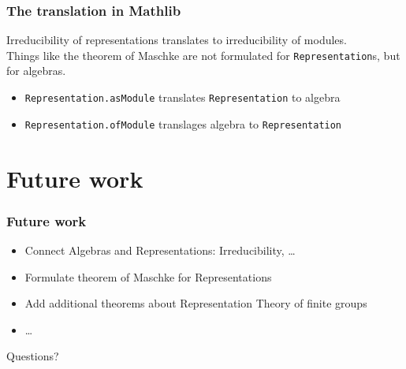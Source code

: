 \documentclass{beamer}
\begin{document}
\begin{frame}[fragile]
\frametitle{The translation in Mathlib}
Irreducibility of representations translates to irreducibility of modules.\\
\pause
Things like the theorem of Maschke are not formulated for \verb+Representation+s, but for algebras.\\
\pause
\vspace{1cm}
\begin{itemize}
\item \verb+Representation.asModule+ translates \verb+Representation+ to algebra
\item \verb+Representation.ofModule+ translages algebra to \verb+Representation+
\end{itemize}
\end{frame}

\section{Future work}
\begin{frame}
\frametitle{Future work}
\begin{itemize}
\pause
\item Connect Algebras and Representations: Irreducibility, \ldots
\pause
\item Formulate theorem of Maschke for Representations
\pause
\item Add additional theorems about Representation Theory of finite groups
\item \ldots
\end{itemize}
\end{frame}


\begin{frame}
\begin{center}
\huge Questions?
\end{center}
\end{frame}
\end{document}
